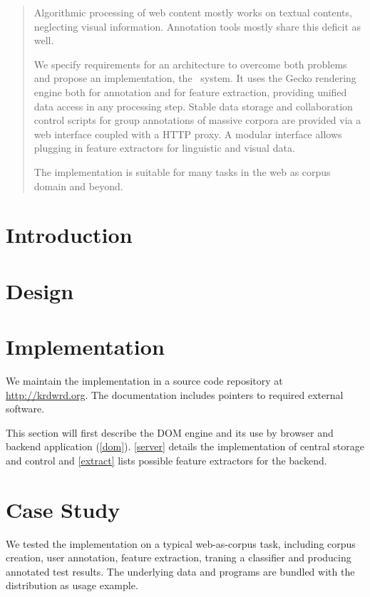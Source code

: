 
\begin{abstract}
Algorithmic processing of web content mostly works on textual contents, neglecting visual information.
Annotation tools mostly share this deficit as well.

We specify requirements for an architecture to overcome both problems and propose an implementation, the \KrdWrd~system.
It uses the Gecko rendering engine both for annotation and for feature extraction, providing unified data access in any processing step.
Stable data storage and collaboration control scripts for group annotations of massive corpora are provided via a web interface coupled with a HTTP proxy.
A modular interface allows plugging in feature extractors for linguistic and visual data.

The implementation is suitable for many tasks in the web as corpus domain and beyond.
\end{abstract}

\section{Introduction}


\section{Design\label{design}}


\section{Implementation\label{impl}}

We maintain the implementation in a source code repository at \url{http://krdwrd.org}.
The documentation includes pointers to required external software.

This section will first describe the DOM engine and its use by browser and backend application (\ref{dom}).
\ref{server} details the implementation of central storage and control and \ref{extract} lists possible feature extractors for the backend.




\section{Case Study\label{casestudy}}

We tested the implementation on a typical web-as-corpus task, including corpus creation, user annotation, feature extraction, traning a classifier and producing annotated test results.
The underlying data and programs are bundled with the {\KrdWrd} distribution as usage example.

